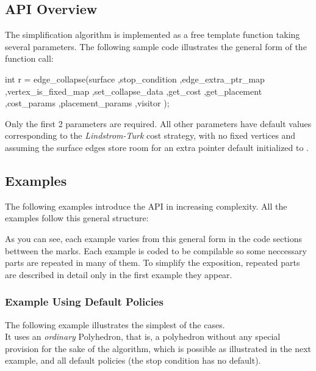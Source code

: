 \subsection{API Overview}

The simplification algorithm is implemented as a free template function taking several parameters. The following sample code illustrates the general form of the function call:

\begin{cprog}
int r = edge_collapse(surface
                     ,stop_condition
                     ,edge_extra_ptr_map
                     ,vertex_is_fixed_map
                     ,set_collapse_data
                     ,get_cost
                     ,get_placement
                     ,cost_params
                     ,placement_params
                     ,visitor 
                     );
\end{cprog}

Only the first 2 parameters are required. All other parameters have default values corresponding to the {\em Lindstrom-Turk} cost strategy, with no fixed vertices and assuming the surface edges store room for an extra pointer default initialized to .

\subsection{Examples}

The following examples introduce the API in increasing complexity. All the examples follow this general structure:


As you can see, each example varies from this general form in the code sections bettween the marks.
Each example is coded to be compilable so some neccessary parts are repeated in many of them. To simplify the exposition, repeated parts are described in detail only in the first example they appear.

\subsubsection{Example Using Default Policies}

The following example illustrates the simplest of the cases.\\
It uses an {\em ordinary} Polyhedron, that is, a polyhedron without any special provision 
for the sake of the algorithm, which is possible as illustrated in the next example, 
and all default policies (the stop condition has no default).


